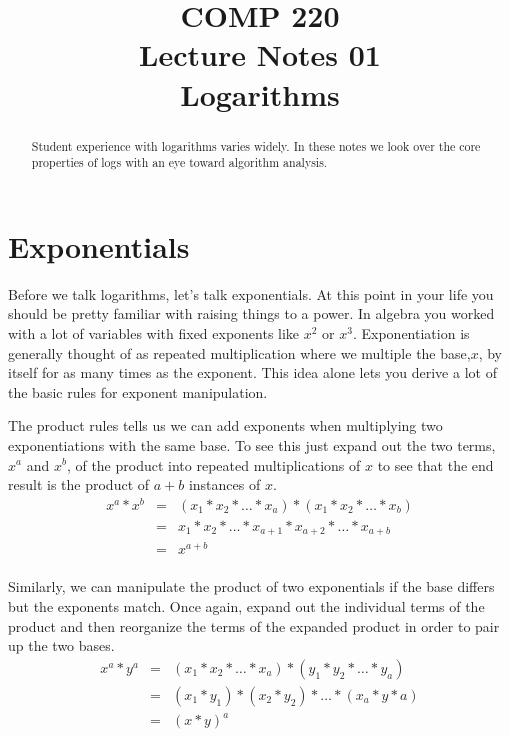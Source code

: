 \documentclass[nobib]{tufte-handout}
\title{COMP 220 \\ Lecture Notes 01 \\ Logarithms}
\begin{document}
\maketitle

\begin{abstract}
Student experience with logarithms varies widely. In these notes we look over the core properties of logs with an eye toward algorithm analysis.
\end{abstract}

\section{Exponentials}

Before we talk logarithms, let's talk exponentials. At this point in your life you should be pretty familiar with raising things to a power. In algebra you worked with a lot of variables with fixed exponents like $x^2$ or $x^3$.  Exponentiation is generally thought of as repeated multiplication where we multiple the base,$x$, by itself for as many times as the exponent. This idea alone lets you derive a lot of the basic rules for exponent manipulation.

The product rules tells us we can add exponents when multiplying two exponentiations with the same base. To see this just expand out the two terms, $x^a$ and $x^b$, of the product into repeated multiplications of $x$ to see that the end result is the product of $a+b$ instances of $x$.
\begin{equation}
  \begin{array}{rcl}
    x^a * x^b &=& (x_1*x_2*\ldots*x_a) * (x_1*x_2*\ldots*x_b) \\
     &=& x_1 * x_2 * \ldots * x_{a+1} * x_{a+2} * \ldots * x_{a+b} \\
     &=& x^{a+b} \\
  \end{array}
\end{equation}

Similarly, we can manipulate the product of two exponentials if the base differs but the exponents match. Once again, expand out the individual terms of the product and then reorganize the terms of the expanded product in order to pair up the two bases.
\begin{equation}
  \begin{array}{rcl}
    x^a * y^a &=& (x_1*x_2*\ldots*x_a) * (y_1*y_2*\ldots*y_a) \\
     &=& (x_1*y_1) * (x_2*y_2) * \ldots * (x_a*y*a) \\
     &=& {(x*y)}^a
  \end{array}
\end{equation}
\end{document}
